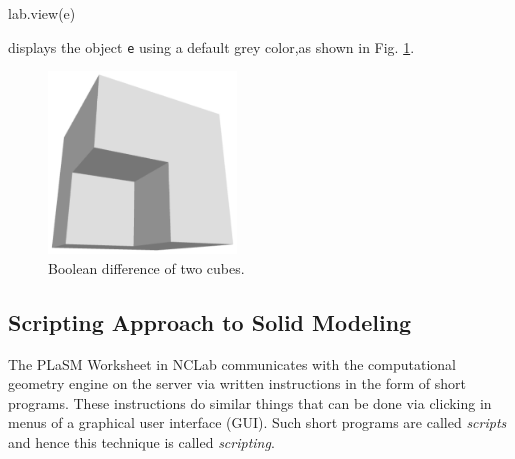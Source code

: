 \begin{bluecode}
lab.view(e)
\end{bluecode}
displays the object {\tt e} using a default grey color,as shown in Fig. \ref{fig:diffcube}.

\begin{figure}[!ht]
\begin{center}
\includegraphics[width=5cm]{img/diffcube.png}
\end{center}
\vspace{-6mm}
\caption{Boolean difference of two cubes.}
\label{fig:diffcube}
\end{figure}

\subsection{Scripting Approach to Solid Modeling}\label{subsec:scripting}


The PLaSM Worksheet in NCLab communicates with the computational geometry engine 
on the server via 
written instructions in the form of short programs. These instructions 
do similar things that can be done via clicking in menus of a graphical user interface (GUI). 
Such short programs are called {\em scripts}
and hence this technique is called {\em scripting}.


